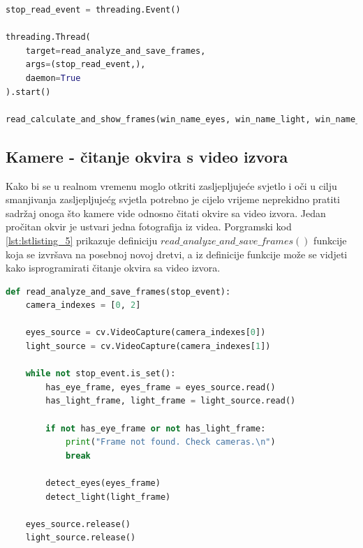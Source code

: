 \documentclass{foi}
\begin{document}
\begin{lstlisting}[language=Python, label={lst:lstlisting_4}, firstnumber=151, style=colored, caption={Inicijaliziranje dretvenog događaja $stop\_read\_event$, stvaranje i pokretanje nove dretve i pozivanje funkcije $read\_analyze\_and\_save\_frames()$ u glavnoj dretvi}]
stop_read_event = threading.Event()

threading.Thread(
    target=read_analyze_and_save_frames,
    args=(stop_read_event,),
    daemon=True
).start()

read_calculate_and_show_frames(win_name_eyes, win_name_light, win_name_protection)
\end{lstlisting}

\subsection{Kamere - čitanje okvira s video izvora}

Kako bi se u realnom vremenu moglo otkriti zasljepljujeće svjetlo i oči u cilju smanjivanja zasljepljujećg svjetla potrebno je cijelo vrijeme neprekidno pratiti sadržaj onoga što kamere vide odnosno čitati okvire sa video izvora. Jedan pročitan okvir je ustvari jedna fotografija iz videa. Porgramski kod \ref{lst:lstlisting_5} prikazuje definiciju $read\_analyze\_and\_save\_frames()$ funkcije koja se izvršava na posebnoj novoj dretvi, a iz definicije funkcije može se vidjeti kako isprogramirati čitanje okvira sa video izvora.

\begin{lstlisting}[language=Python, label={lst:lstlisting_5}, firstnumber=13, style=colored, caption={Definicija funkcije $read\_analyze\_and\_save\_frames()$}]
def read_analyze_and_save_frames(stop_event):
    camera_indexes = [0, 2]

    eyes_source = cv.VideoCapture(camera_indexes[0])
    light_source = cv.VideoCapture(camera_indexes[1])

    while not stop_event.is_set():
        has_eye_frame, eyes_frame = eyes_source.read()
        has_light_frame, light_frame = light_source.read()

        if not has_eye_frame or not has_light_frame:
            print("Frame not found. Check cameras.\n")
            break

        detect_eyes(eyes_frame)
        detect_light(light_frame)

    eyes_source.release()
    light_source.release()
\end{lstlisting}
\end{document}

